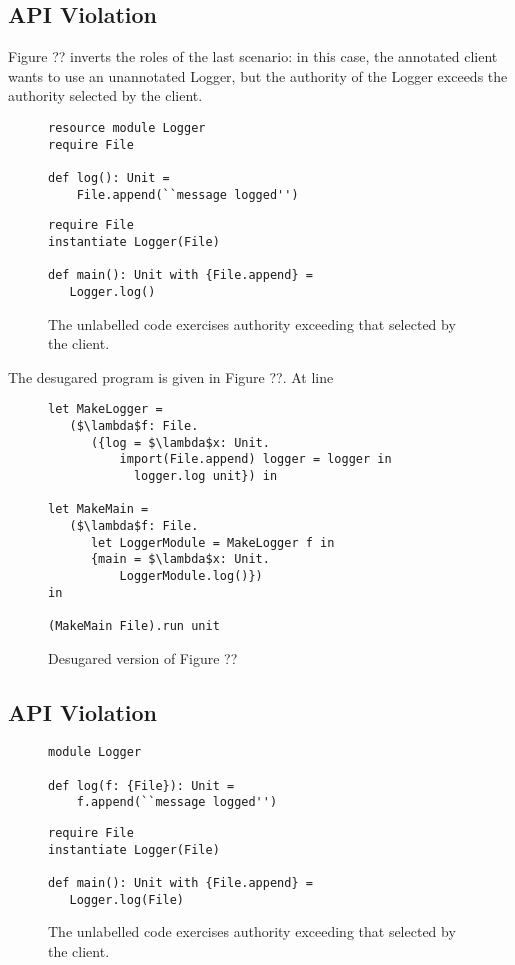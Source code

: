 \subsection{API Violation}

Figure ?? inverts the roles of the last scenario: in this case, the annotated client wants to use an unannotated Logger, but the authority of the Logger exceeds the authority selected by the client.

\begin{figure}[h]

\begin{lstlisting}
resource module Logger
require File

def log(): Unit =
    File.append(``message logged'')
\end{lstlisting}

\begin{lstlisting}
require File
instantiate Logger(File)

def main(): Unit with {File.append} =
   Logger.log()
\end{lstlisting}

\caption{The unlabelled code exercises authority exceeding that selected by the client.}
\label{This is the label.}
\end{figure}

The desugared program is given in Figure ??. At line 

\begin{figure}[h]

\begin{lstlisting}
let MakeLogger =
   ($\lambda$f: File.
      ({log = $\lambda$x: Unit.
          import(File.append) logger = logger in
            logger.log unit}) in

let MakeMain =
   ($\lambda$f: File.
      let LoggerModule = MakeLogger f in
      {main = $\lambda$x: Unit.
          LoggerModule.log()})
in

(MakeMain File).run unit
\end{lstlisting}

\caption{Desugared version of Figure ??}
\label{This is the label.}
\end{figure}

\subsection{API Violation}

\begin{figure}[h]

\begin{lstlisting}
module Logger

def log(f: {File}): Unit =
    f.append(``message logged'')
\end{lstlisting}

\begin{lstlisting}
require File
instantiate Logger(File)

def main(): Unit with {File.append} =
   Logger.log(File)
\end{lstlisting}

\caption{The unlabelled code exercises authority exceeding that selected by the client.}
\label{This is the label.}
\end{figure}


